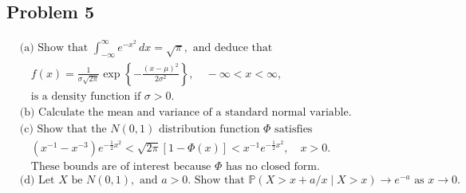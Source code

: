 \documentclass[letterpaper, 11pt]{article}
\newcommand{\1}{\mathds{1}}	%
\theoremstyle{definition}
\begin{document}
 \subsection*{Problem 5}
 \begin{align*}
    &\text{(a) Show that } \int_{-\infty}^{\infty} e^{-x^2} \, dx = \sqrt{\pi}, \text{ and deduce that} \\
    &\quad f(x) = \frac{1}{\sigma\sqrt{2\pi}} \exp\left\{-\frac{(x-\mu)^2}{2\sigma^2}\right\}, \quad -\infty < x < \infty, \\
    &\quad \text{is a density function if } \sigma > 0. \\
    &\text{(b) Calculate the mean and variance of a standard normal variable.} \\
    &\text{(c) Show that the } N(0,1) \text{ distribution function } \Phi \text{ satisfies} \\
    &\quad (x^{-1} - x^{-3})e^{-\frac{1}{2}x^2} < \sqrt{2\pi}[1 - \Phi(x)] < x^{-1}e^{-\frac{1}{2}x^2}, \quad x > 0. \\
    &\quad \text{These bounds are of interest because } \Phi \text{ has no closed form.} \\
    &\text{(d) Let } X \text{ be } N(0,1), \text{ and } a > 0. \text{ Show that } \mathbb{P}(X > x + a/x \mid X > x) \to e^{-a} \text{ as } x \to 0.
    \end{align*}
\end{document}
